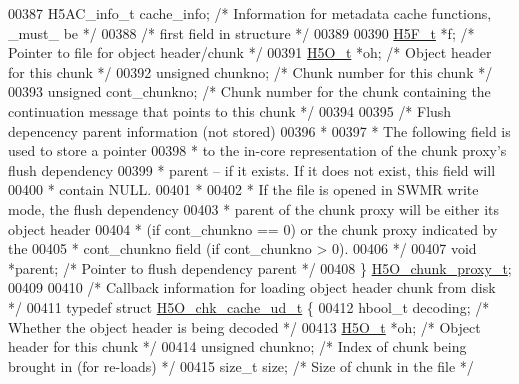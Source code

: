 \begin{DoxyCode}
00387     H5AC\_info\_t cache\_info;    \textcolor{comment}{/* Information for metadata cache functions, \_must\_ be */}
00388                                 \textcolor{comment}{/* first field in structure */}
00389 
00390     \hyperlink{struct_h5_f__t}{H5F\_t} *f;                           \textcolor{comment}{/* Pointer to file for object header/chunk */}
00391     \hyperlink{struct_h5_o__t}{H5O\_t}       *oh;                    \textcolor{comment}{/* Object header for this chunk */}
00392     \textcolor{keywordtype}{unsigned}    chunkno;                \textcolor{comment}{/* Chunk number for this chunk */}
00393     \textcolor{keywordtype}{unsigned}    cont\_chunkno;           \textcolor{comment}{/* Chunk number for the chunk containing the continuation message
       that points to this chunk */}
00394 
00395     \textcolor{comment}{/* Flush depencency parent information (not stored) }
00396 \textcolor{comment}{     *}
00397 \textcolor{comment}{     * The following field is used to store a pointer }
00398 \textcolor{comment}{     * to the in-core representation of the chunk proxy's flush dependency}
00399 \textcolor{comment}{     * parent -- if it exists.  If it does not exist, this field will}
00400 \textcolor{comment}{     * contain NULL.}
00401 \textcolor{comment}{     *}
00402 \textcolor{comment}{     * If the file is opened in SWMR write mode, the flush dependency }
00403 \textcolor{comment}{     * parent of the chunk proxy will be either its object header }
00404 \textcolor{comment}{     * (if cont\_chunkno == 0) or the chunk proxy indicated by the }
00405 \textcolor{comment}{     * cont\_chunkno field (if cont\_chunkno > 0).}
00406 \textcolor{comment}{     */}
00407     \textcolor{keywordtype}{void} *parent;                       \textcolor{comment}{/* Pointer to flush dependency parent */}
00408 \} \hyperlink{struct_h5_o__chunk__proxy__t}{H5O\_chunk\_proxy\_t};
00409 
00410 \textcolor{comment}{/* Callback information for loading object header chunk from disk */}
00411 \textcolor{keyword}{typedef} \textcolor{keyword}{struct }\hyperlink{struct_h5_o__chk__cache__ud__t}{H5O\_chk\_cache\_ud\_t} \{
00412     hbool\_t decoding;                   \textcolor{comment}{/* Whether the object header is being decoded */}
00413     \hyperlink{struct_h5_o__t}{H5O\_t} *oh;                          \textcolor{comment}{/* Object header for this chunk */}
00414     \textcolor{keywordtype}{unsigned} chunkno;                   \textcolor{comment}{/* Index of chunk being brought in (for re-loads) */}
00415     \textcolor{keywordtype}{size\_t} size;                        \textcolor{comment}{/* Size of chunk in the file */}

\end{DoxyCode}
